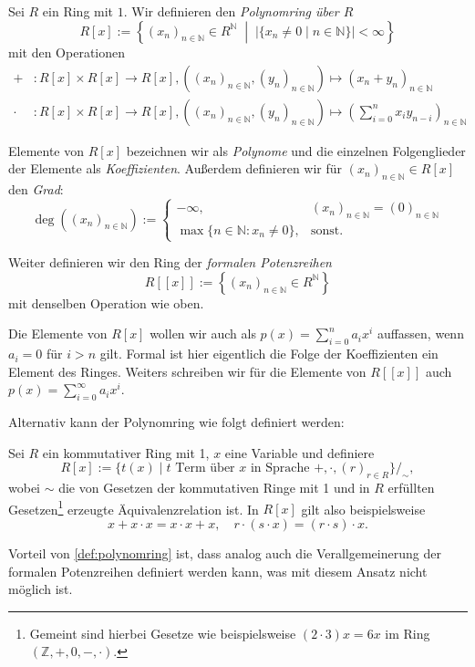 \begin{definition}\label{def:polynomring}
    Sei $R$ ein Ring mit $1$. Wir definieren den \emph{Polynomring über $R$}
    $$R[x]:=\left\{(x_n)_{n\in \mathbb{N}} \in R^\mathbb{N} \;\middle|\; \vert\{x_n\neq 0\mid n\in \mathbb{N}\}\vert<\infty\right\}$$
    mit den Operationen
    \begin{align*}
        + &: R[x] \times R[x] \to R[x], ((x_n)_{n\in \mathbb{N}}, (y_n)_{n\in\mathbb{N}}) \mapsto (x_n+y_n)_{n\in\mathbb{N}}\\
        \cdot &: R[x] \times R[x] \to R[x], ((x_n)_{n\in \mathbb{N}}, (y_n)_{n\in\mathbb{N}}) \mapsto \left(\sum_{i=0}^n x_i y_{n-i}\right)_{n\in\mathbb{N}}
    \end{align*}

    Elemente von $R[x]$ bezeichnen wir als \emph{Polynome} und die einzelnen Folgenglieder der Elemente als \emph{Koeffizienten}. Außerdem definieren wir für $(x_n)_{n\in\mathbb{N}}\in R[x]$ den \emph{Grad}:
    $$\deg ((x_n)_{n\in\mathbb{N}}):=
    \begin{cases}
        -\infty, & (x_n)_{n\in\mathbb{N}}=(0)_{n\in\mathbb{N}}\\
        \max\{n\in\mathbb{N}:x_n\neq 0\}, & \text{sonst.}
    \end{cases}$$

    Weiter definieren wir den Ring der \emph{formalen Potenzreihen} 
    $$R[[x]]:=\left\{(x_n)_{n \in \mathbb{N}} \in R^\mathbb{N}\right\}$$
    mit denselben Operation wie oben. 
    
    Die Elemente von $R[x]$ wollen wir auch als $p(x)=\sum_{i=0}^na_ix^i$ auffassen, wenn $a_i=0$ für $i>n$ gilt. Formal ist hier eigentlich die Folge
    der Koeffizienten ein Element des Ringes. Weiters schreiben wir für die Elemente von $R[[x]]$ auch
    $p(x)=\sum_{i=0}^\infty a_ix^i$.
\end{definition}

\begin{remark}
    Alternativ kann der Polynomring wie folgt definiert werden:

    Sei $R$ ein kommutativer Ring mit 1, $x$ eine Variable und definiere
    $$ R[x] := \{ t(x) \mid t \text{ Term über $x$ in Sprache } +, \cdot, (r)_{r \in R} \}/_\sim, $$
    wobei $\sim$ die von Gesetzen der kommutativen Ringe mit 1 und in $R$ erfüllten Gesetzen\footnote{Gemeint sind hierbei Gesetze wie beispielsweise $(2\cdot 3)x=6x$ im Ring $(\mathbb{Z},+,0,-,\cdot)$.} erzeugte Äquivalenz\-relation ist. In $R[x]$ gilt also beispielsweise
    $$ x + x \cdot x = x \cdot x + x, \quad r \cdot (s \cdot x) = (r \cdot s) \cdot x. $$

    Vorteil von \cref{def:polynomring} ist, dass analog auch die Verallgemeinerung der formalen Potenzreihen definiert werden kann, was mit diesem Ansatz nicht möglich ist.
\end{remark}

